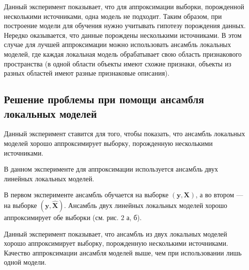 \documentclass[12pt, twoside]{article}
\begin{document}
Данный эксперимент показывает, что для аппроксимации выборки, порожденной несколькими источниками, одна модель не подходит. Таким образом, при построение модели для обучения нужно учитывать гипотезу порождения данных. Нередко оказывается, что данные порождены несколькими источниками. В этом случае для лучшей аппроксимации можно использовать ансамбль локальных моделей, где каждая локальная модель обрабатывает свою область признакового пространства (в одной области объекты имеют схожие признаки, объекты из разных областей имеют разные признаковые описания).

\subsection{Решение проблемы при помощи ансамбля локальных моделей}

Данный эксперимент ставится для того, чтобы показать, что ансамбль локальных моделей хорошо аппроксимирует выборку, порожденную несколькими источниками.


В данном эксперименте для аппроксимации используется ансамбль двух линейных локальных моделей. 

В первом эксперименте ансамбль обучается на выборке $(\mathbf{y}, \mathbf{X})$, а во втором --- на выборке $(\mathbf{y}, \mathbf{\hat{X}})$. Ансамбль двух линейных локальных моделей хорошо аппроксимирует обе выборки (см. рис. $2$ а, б).  


Данный эксперимент показывает, что ансамбль из двух локальных моделей хорошо аппроксимирует выборку, порожденную несколькими источниками. Качество аппроксимации ансамбля моделей выше, чем при использовании лишь одной модели. 
\end{document}
